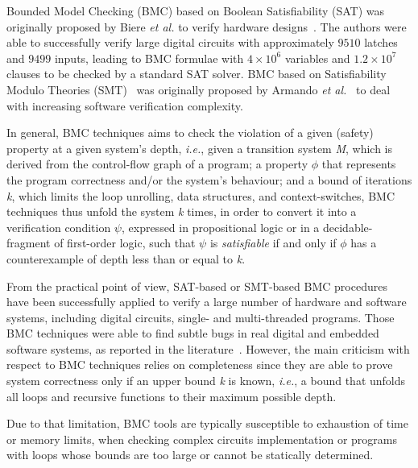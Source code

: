 \documentclass{acm_sen_article}
\begin{document}
Bounded Model Checking (BMC) based on Boolean Satisfiability (SAT) was originally proposed by Biere {\it et al.} to verify hardware designs~\cite{Biere99,handbook09}. The authors were able to successfully verify large digital circuits with approximately $9510$ latches and $9499$ inputs, leading to BMC formulae with $4 \times 10^6$ variables and $1.2 \times 10^7$ clauses to be checked by a standard SAT solver. BMC based on Satisfiability Modulo Theories (SMT)~\cite{BarrettSST09} was originally proposed by Armando {\it et al.}~\cite{Armando06} to deal with increasing software verification complexity. 

In general, BMC techniques aims to check the violation of a given (safety) property at a given system's depth, {\it i.e.}, given a transition system \textit{M}, which is derived from the control-flow graph of a program; a property $\phi$ that represents the program correctness and/or the system's behaviour; and a bound of iterations \textit{k}, which limits the loop unrolling, data structures, and context-switches, BMC techniques thus unfold the system \textit{k} times, in order to convert it into a verification condition $\psi$, expressed in propositional logic or in a decidable-fragment of first-order logic, such that $\psi$ is \textit{satisfiable} if and only if $\phi$ has a counterexample of depth less than or equal to \textit{k}.

From the practical point of view, SAT-based or SMT-based BMC procedures have been successfully applied to verify a large number of hardware and software systems, including digital circuits, single- and multi-threaded programs. Those BMC techniques were able to find subtle bugs in real digital and embedded software systems, as reported in the literature~\cite{Clarke04,MerzFS12,CordeiroF11,Ivancic05,Cordeiro12}. However, the main criticism with respect to BMC techniques relies on completeness since they are able to prove system correctness only if an upper bound \textit{k} is known, {\it i.e.}, a bound that unfolds all loops and recursive functions to their maximum possible depth. 

Due to that limitation, BMC tools are typically susceptible to exhaustion of time or memory limits, when checking complex circuits implementation or programs with loops whose bounds are too large or cannot be statically determined.  
\end{document}
